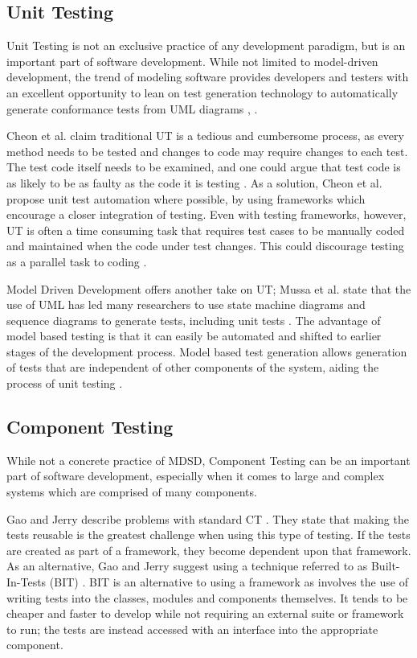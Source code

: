 \documentclass[fina_report_innit.tex]{subfiles}
\begin{document}
\subsection{Unit Testing}
Unit Testing is not an exclusive practice of any development paradigm, but is an important part of software development. While not limited to model-driven development, the trend of modeling software provides developers and testers with an excellent opportunity to lean on test generation technology to automatically generate conformance tests from UML diagrams \cite{mussa2009survey}, \cite{hartmann2004uml}.  

Cheon et al. claim traditional UT is a tedious and cumbersome process, as every method needs to be tested and changes to code may require changes to each test. The test code itself needs to be examined, and one could argue that test code is as likely to be as faulty as the code it is testing \cite{cheon2002simple}. As a solution, Cheon et al. propose unit test automation where possible, by using frameworks which encourage a closer integration of testing. Even with testing frameworks, however, UT is often a time consuming task that requires test cases to be manually coded and maintained when the code under test changes. This could discourage testing as a parallel task to coding \cite{cheon2002simple}. 

Model Driven Development offers another take on UT; Mussa et al. state that the use of UML has led many researchers to use state machine diagrams and sequence diagrams to generate tests, including unit tests \cite{mussa2009survey}. The advantage of model based testing is that it can easily be automated and shifted to earlier stages of the development process. Model based test generation allows generation of tests that are independent of other components of the system, aiding the process of unit testing \cite{javed2007automated}.

\subsection{Component Testing}
While not a concrete practice of MDSD, Component Testing can be an important part of software development, especially when it comes to large and complex systems which are comprised of many components.

Gao and Jerry describe problems with standard CT \cite{gao2000component}. They state that making the tests reusable is the greatest challenge when using this type of testing. If the tests are created as part of a framework, they become dependent upon that framework. As an alternative, Gao and Jerry suggest using a technique referred to as Built-In-Tests (BIT) \cite{gao2000component}. BIT is an alternative to using a framework as involves the use of writing tests into the classes, modules and components themselves. It tends to be cheaper and faster to develop while not requiring an external suite or framework to run; the tests are instead accessed with an interface into the appropriate component.
\end{document}
